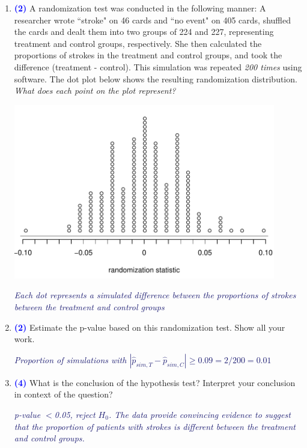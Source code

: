 \documentclass[11pt]{article}
\newcommand{\soln}[1]{\textcolor{MidnightBlue}{\textit{#1}}}	%
\newcommand{\pts}[1]{ \textbf{{\footnotesize \textcolor{blue}{(#1)}}} }	%
\begin{document}
\begin{enumerate}
\begin{enumerate}
\item \pts{2} A randomization test was conducted in the following manner: A researcher wrote ``stroke" on 46 cards and ``no event" on 405 cards, shuffled the cards and dealt them into two groups of 224 and 227, representing treatment and control groups, respectively. She then calculated the proportions of strokes in the treatment and control groups, and took the difference (treatment - control). This simulation was repeated \emph{200 times} using software. The dot plot below shows the resulting randomization distribution. \emph{What does each point on the plot represent?}
\begin{minipage}[c]{0.5\textwidth}
\includegraphics[width=0.9\textwidth]{figures/stroke/stroke}
\end{minipage}
\begin{minipage}[c]{0.3\textwidth}
\soln{Each dot represents a simulated difference between the proportions of strokes between the treatment and control groups}
\end{minipage}

\vfill

\pagebreak

%

\item \pts{2} Estimate the p-value based on this randomization test. Show all your work.

\soln{Proportion of simulations with $|\hat{p}_{sim,T} - \hat{p}_{sim,C}| \ge 0.09 = 2 / 200 = 0.01$}
$\:$ \\

\item \pts{4} What is the conclusion of the hypothesis test? Interpret your conclusion in context of the question?

\soln{p-value $<$0.05, reject $H_0$. The data provide convincing evidence to suggest that the proportion of patients with strokes is different between the treatment and control groups.}
$\:$ \\


\end{enumerate}
\end{enumerate}
\end{document}

